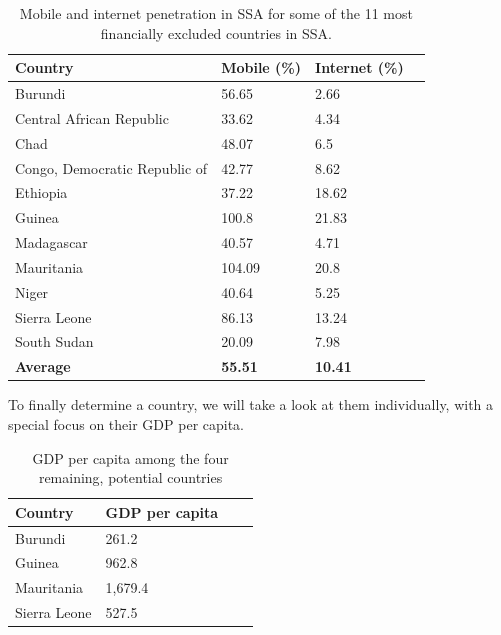 \documentclass[11pt, a4paper]{article}
\begin{document}
\begin{table}[ht]
\centering
\begin{tabular}{|l|l|l|l|}
\hline
\textbf{Country}        & \textbf{Mobile (\%)} & \textbf{Internet (\%)} \\ \hline
Burundi             & 56.65             & 2.66                                        \\ \hline
Central African Republic    & 33.62             & 4.34                                      \\ \hline
Chad              & 48.07             & 6.5                                       \\ \hline
Congo, Democratic Republic of & 42.77             & 8.62                                       \\ \hline
Ethiopia            & 37.22             & 18.62                                       \\ \hline
Guinea            & 100.8             & 21.83                                       \\ \hline
Madagascar          & 40.57             & 4.71                                        \\ \hline
Mauritania          & 104.09            & 20.8                                       \\ \hline
Niger             & 40.64             & 5.25                                        \\ \hline
Sierra Leone          & 86.13             & 13.24                                       \\ \hline
South Sudan           & 20.09             & 7.98                                        \\ \hline
\textbf{Average}        & \textbf{55.51}        & \textbf{10.41}                                        \\ \hline
\end{tabular}
\caption{Mobile\cite{wbdata} and internet\cite{wbdata} penetration in SSA for some of the 11 most financially excluded countries in SSA.}
\label{tab:mob_internet_ssa}
\end{table}


To finally determine a country, we will take a look at them individually, with a special focus on their GDP per capita.

\begin{table}[ht]
\centering
\begin{tabular}{|l|l|l|l|}
\hline
\textbf{Country}        & \textbf{GDP per capita} \\ \hline
Burundi             & 261.2   \\ \hline
Guinea            & 962.8 \\ \hline
Mauritania          & 1,679.4 \\ \hline
Sierra Leone          & 527.5 \\ \hline
\end{tabular}
\caption{GDP per capita\cite{wbdata} among the four remaining, potential countries}
\label{tab:gdp_internet_ssa}
\end{table}
\end{document}
